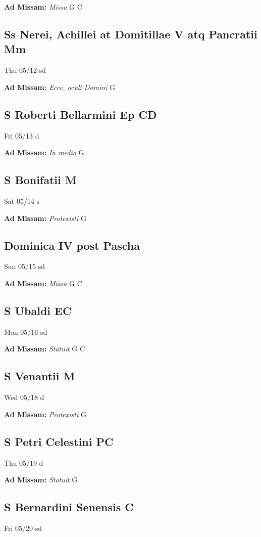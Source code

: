 \documentclass[letterpaper, 10pt, twocolumn]{article}
\begin{document}
\textbf{Ad Missam:} \textit{Missa} G C 

\subsection*{Ss Nerei, Achillei at Domitillae V atq Pancratii Mm}Thu 05/12 sd

\textbf{Ad Missam:} \textit{Ecce, oculi Domini} G 

\subsection*{S Roberti Bellarmini Ep CD}Fri 05/13 d

\textbf{Ad Missam:} \textit{In medio} G 

\subsection*{S Bonifatii M}Sat 05/14 s

\textbf{Ad Missam:} \textit{Protexisti} G 

\subsection*{Dominica IV post Pascha}Sun 05/15 sd

\textbf{Ad Missam:} \textit{Missa} G C 

\subsection*{S Ubaldi EC}Mon 05/16 sd

\textbf{Ad Missam:} \textit{Statuit} G C 

\subsection*{S Venantii M}Wed 05/18 d

\textbf{Ad Missam:} \textit{Protexisti} G 

\subsection*{S Petri Celestini PC}Thu 05/19 d

\textbf{Ad Missam:} \textit{Statuit} G 

\subsection*{S Bernardini Senensis C}Fri 05/20 sd
\end{document}
